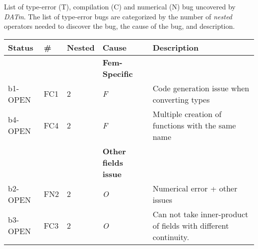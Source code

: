 \documentclass{article}
\newcommand{\fontit}[1]{\textit{#1}}
\newcommand{\checkname}[0]{\textit{DATm}}
\begin{document}
List of type-error (T), compilation (C) and numerical (N) bug uncovered by \checkname{}.
 The list of type-error bugs are categorized by the number of \fontit{nested} operators needed to discover the bug,  the cause of the bug, and description.
\newline 
\begin{tabular}{|l|llll|}
\hline
Status & \# &Nested & Cause & Description\\
\hline \hline &&&\textbf{Fem-Specific}&\\
b1-OPEN &FC1 &2&\fontit{F}&Code generation issue when converting types\\
b4-OPEN &FC4 &2&\fontit{F}&Multiple creation of functions with the same name \\
&&&\textbf{Other fields issue}&\\
b2-OPEN &FN2 &2&\fontit{O}&Numerical error + other issues\\
b3-OPEN &FC3 &2&\fontit{O}& Can not take inner-product of fields with different continuity.\\
\hline
\end{tabular}

\end{document}
